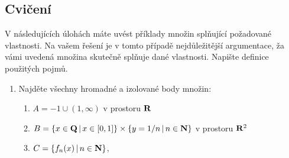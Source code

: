 \subsection{Cvičení}
V následujících úlohách máte uvést příklady množin splňující požadované vlastnosti. Na vašem řešení je
v tomto případě nejdůležitější argumentace, ža vámi uvedená množina skutečně splňuje dané vlastnosti.
Napište definice použitých pojmů.
\begin{enumerate}
 \item Najděte všechny hromadné a izolované body množin:
        \begin{enumerate}
                \item $A={-1}\cup(1,\infty)$ v prostoru ${\rm\bf R}$
                \item $B=\{x\in {\rm\bf Q}\,|\, x\in[0,1]\}\times\{y=1/n\,|\, n\in{\rm\bf N}\}$ v prostoru ${\rm\bf R}^2$
                \item $C=\{f_n(x)\,|\, n\in {\rm\bf N}\}$,
                

\end{enumerate}
\end{enumerate}
